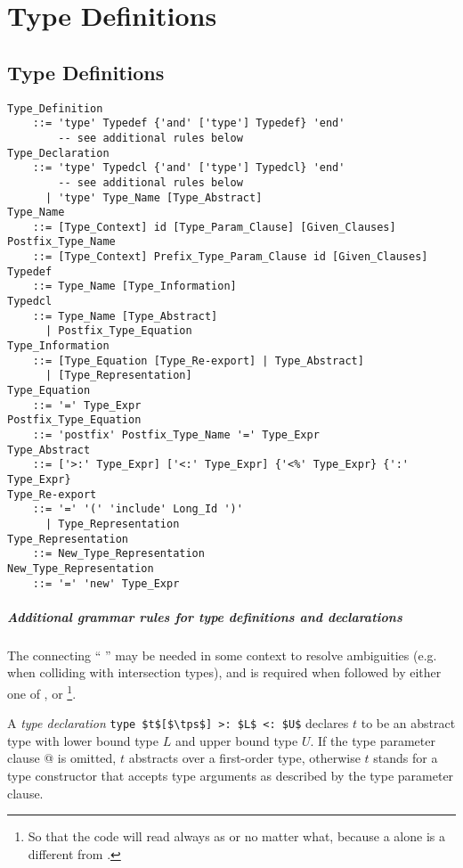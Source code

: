 
\chapter{Type Definitions}

\minitoc

\newpage

\section{Type Definitions}
\label{sec:type-decls-aliases}

\grammar\begin{lstlisting}
Type_Definition 
    ::= 'type' Typedef {'and' ['type'] Typedef} 'end'
        -- see additional rules below
Type_Declaration
    ::= 'type' Typedcl {'and' ['type'] Typedcl} 'end'
        -- see additional rules below
      | 'type' Type_Name [Type_Abstract]
Type_Name
    ::= [Type_Context] id [Type_Param_Clause] [Given_Clauses]
Postfix_Type_Name
    ::= [Type_Context] Prefix_Type_Param_Clause id [Given_Clauses]
Typedef 
    ::= Type_Name [Type_Information]
Typedcl
    ::= Type_Name [Type_Abstract]
      | Postfix_Type_Equation
Type_Information
    ::= [Type_Equation [Type_Re-export] | Type_Abstract]
      | [Type_Representation]
Type_Equation 
    ::= '=' Type_Expr
Postfix_Type_Equation
    ::= 'postfix' Postfix_Type_Name '=' Type_Expr
Type_Abstract 
    ::= ['>:' Type_Expr] ['<:' Type_Expr] {'<%' Type_Expr} {':' Type_Expr}
Type_Re-export
    ::= '=' '(' 'include' Long_Id ')'
      | Type_Representation
Type_Representation
    ::= New_Type_Representation
New_Type_Representation
    ::= '=' 'new' Type_Expr
\end{lstlisting}

\paragraph{Additional grammar rules for type definitions and declarations}
The connecting ``\,\code{['type']}\,'' may be needed in some context to resolve ambiguities (e.g. when colliding with intersection types), and is required when followed by either one of ,  or \footnote{So that the code will read always as  or  no matter what, because a  alone is a different from .}. 

A {\em type declaration} \lstinline!type $t$[$\tps$] >: $L$ <: $U$! declares $t$ to be an abstract type with lower bound type $L$ and upper bound type $U$. If the type parameter clause \lstinline@[$\tps$]@ is omitted, $t$ abstracts over a first-order type, otherwise $t$ stands for a type constructor that accepts type arguments as described by the type parameter clause. 

